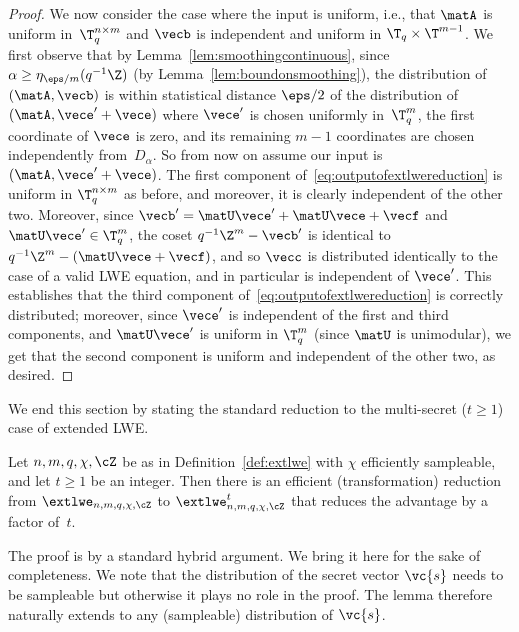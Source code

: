 \begin{proof}
We now consider the case where the input is uniform, i.e.,
that $\matA$ is uniform in~$\T_q^{n\times m}$
and $\vecb$ is independent and uniform in $\T_q \times \T^{m-1}$.
We first observe that by Lemma~\ref{lem:smoothingcontinuous}, since $\alpha \ge \eta_{\eps/m}(q^{-1}\Z)$ (by Lemma~\ref{lem:boundonsmoothing}),
the distribution of~$(\matA,\vecb)$ is within statistical distance $\eps/2$
of the distribution of $(\matA, \vece' + \vece)$ where $\vece'$ is
chosen uniformly in~$\T_q^m$, the first coordinate of $\vece$ is zero,
and its remaining $m-1$ coordinates are chosen independently from~$D_\alpha$.
So from now on assume our input is $(\matA,\vece'+\vece)$.
The first component of~\eqref{eq:outputofextlwereduction} is uniform
in $\T_q^{n \times m}$ as before, and moreover, it is clearly independent
of the other two. Moreover, since $\vecb' = \matU \vece' + \matU \vece + \vecf$ and $\matU \vece' \in \T_q^m$,
the coset $q^{-1}\Z^m - \vecb'$ is identical to
$q^{-1}\Z^m - (\matU \vece + \vecf)$, and so $\vecc$ is distributed
identically to the case of a valid LWE equation, and in particular
is independent of $\vece'$. This establishes that the third component
of~\eqref{eq:outputofextlwereduction} is correctly distributed;
moreover, since $\vece'$ is independent of the first and third components,
and $\matU \vece'$ is uniform in $\T_q^m$ (since $\matU$ is unimodular),
we get that the second component is uniform and independent of the other two,
as desired.
\end{proof}

We end this section by stating the standard reduction to the multi-secret ($t \ge 1$) case of extended LWE. 



\begin{lemma}\label{lem:multiinstanceextlwe}
Let $n, m, q, \chi, \cZ$ be as in Definition~\ref{def:extlwe} with $\chi$ efficiently sampleable, and let $t \ge 1$ be an integer. 
Then there is an efficient (transformation) reduction from $\extlwe_{n,m,q,\chi,\cZ}$ to $\extlwe^t_{n,m,q,\chi,\cZ}$ that reduces the advantage by 
a factor of~$t$.
\end{lemma}

The proof is by a standard hybrid argument. We bring it here for the sake of completeness. We note that the distribution of the secret vector $\vc{s}$ needs to be sampleable but otherwise it plays no role in the proof. The lemma therefore naturally extends to any (sampleable) distribution of $\vc{s}$.


